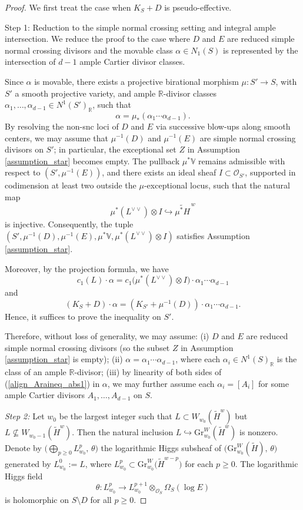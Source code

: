 \documentclass[11pt,letterpaper]{amsart}
\numberwithin{equation}{section}
\begin{document}
\begin{proof}
	We first treat the case when $K_S+D$ is pseudo-effective.
	
	Step 1: Reduction to the simple normal crossing setting and integral ample intersection.  
	We reduce the proof to the case where $D$ and $E$ are reduced simple normal crossing divisors and the movable class $\alpha \in N_1(S)$ is represented by the intersection of $d-1$ ample Cartier divisor classes.
	
	Since $\alpha$ is movable, there exists a projective birational morphism $\mu \colon S' \to S$, with $S'$ a smooth projective variety, and ample $\mathbb{R}$-divisor classes $\alpha_1, \dots, \alpha_{d-1} \in N^1(S')_\mathbb{R}$, such that  
	\[
	\alpha = \mu_*(\alpha_1 \cdots \alpha_{d-1}).
	\]  
	By resolving the non-snc loci of $D$ and $E$ via successive blow-ups along smooth centers, we may assume that $\mu^{-1}(D)$ and $\mu^{-1}(E)$ are simple normal crossing divisors on $S'$; in particular, the exceptional set $Z$ in Assumption \ref{assumption_star} becomes empty. The pullback $\mu^*\mathbb{V}$ remains admissible with respect to $(S', \mu^{-1}(E))$, and there exists an ideal sheaf $I \subset \mathcal{O}_{S'}$, supported in codimension at least two outside the $\mu$-exceptional locus, such that the natural map  
	\[
	\mu^*(L^{\vee\vee}) \otimes I \hookrightarrow \widetilde{\mu^* H}^{\,w}
	\]  
	is injective. Consequently, the tuple $(S', \mu^{-1}(D), \mu^{-1}(E), \mu^*\mathbb{V}, \mu^*(L^{\vee\vee}) \otimes I)$ satisfies Assumption \ref{assumption_star}.
	
	Moreover, by the projection formula, we have  
	\[
	c_1(L) \cdot \alpha = c_1\big(\mu^*(L^{\vee\vee}) \otimes I\big) \cdot \alpha_1 \cdots \alpha_{d-1}
	\]  
	and  
	\[
	(K_S + D) \cdot \alpha = (K_{S'} + \mu^{-1}(D)) \cdot \alpha_1 \cdots \alpha_{d-1}.
	\]  
	Hence, it suffices to prove the inequality on $S'$.
	
	Therefore, without loss of generality, we may assume:  
	(i) $D$ and $E$ are reduced simple normal crossing divisors (so the subset $Z$ in Assumption \ref{assumption_star} is empty);  
	(ii) $\alpha = \alpha_1 \cdots \alpha_{d-1}$, where each $\alpha_i \in N^1(S)_\mathbb{R}$ is the class of an ample $\mathbb{R}$-divisor;  
	(iii) by linearity of both sides of (\ref{align_Araineq_abs1}) in $\alpha$, we may further assume each $\alpha_i = [A_i]$ for some ample Cartier divisors $A_1, \dots, A_{d-1}$ on $S$.
    
    \emph{Step 2:} 
	Let $w_0$ be the largest integer such that $L \subset W_{w_0}(\widetilde{H}^w)$ but $L \nsubseteq W_{w_0-1}(\widetilde{H}^w)$. Then the natural inclusion $L \hookrightarrow \mathrm{Gr}^W_{w_0}(\widetilde{H}^w)$ is nonzero. Denote by $\big(\bigoplus_{p \geq 0} L^p_{w_0},\, \theta\big)$ the logarithmic Higgs subsheaf of $\big(\mathrm{Gr}^W_{w_0}(\widetilde{H}),\, \theta\big)$ generated by $L^0_{w_0} := L$, where $L^p_{w_0} \subset \mathrm{Gr}^W_{w_0}\big(\widetilde{H}^{w-p}\big)$ for each $p \geq 0$. The logarithmic Higgs field  
	\[
	\theta \colon L^p_{w_0} \to L^{p+1}_{w_0} \otimes_{\mathcal{O}_S} \Omega_S(\log E)
	\]  
	is holomorphic on $S \setminus D$ for all $p \geq 0$.
	

\end{proof}
\end{document}
